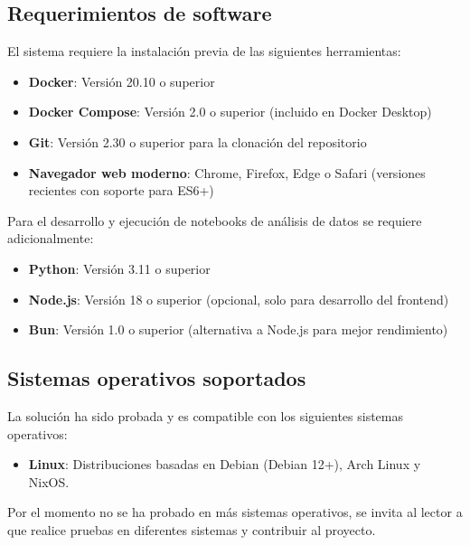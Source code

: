 \subsection{Requerimientos de software}
\label{subsec:chp7-1-2}

El sistema requiere la instalación previa de las siguientes herramientas:

\begin{itemize}
    \item \textbf{Docker}: Versión 20.10 o superior\cite{moby_license}
    \item \textbf{Docker Compose}: Versión 2.0 o superior (incluido en Docker Desktop)
    \item \textbf{Git}: Versión 2.30 o superior para la clonación del repositorio\cite{git_about}
    \item \textbf{Navegador web moderno}: Chrome, Firefox, Edge o Safari (versiones recientes con soporte para ES6+)
\end{itemize}

Para el desarrollo y ejecución de notebooks de análisis de datos se requiere adicionalmente:

\begin{itemize}
    \item \textbf{Python}: Versión 3.11 o superior\cite{python_license}
    \item \textbf{Node.js}: Versión 18 o superior (opcional, solo para desarrollo del frontend)
    \item \textbf{Bun}: Versión 1.0 o superior (alternativa a Node.js para mejor rendimiento)\cite{bun_github}
\end{itemize}

\subsection{Sistemas operativos soportados}
\label{subsec:chp7-1-3}

La solución ha sido probada y es compatible con los siguientes sistemas operativos:

\begin{itemize}
    \item \textbf{Linux}: Distribuciones basadas en Debian (Debian 12+), Arch Linux y NixOS.
\end{itemize}

Por el momento no se ha probado en más sistemas operativos, se invita al lector a que realice pruebas en diferentes sistemas y contribuir al proyecto.

